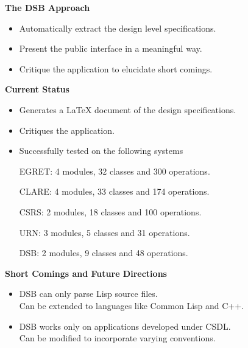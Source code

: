 \begin{slide} \Huge 
  {\bf The DSB Approach}
  \horizontalline

  \begin{itemize}    
  \item Automatically extract the design level specifications.

   \item Present the public interface in a meaningful way.
    
  \item Critique the application to elucidate short comings.

  \end{itemize}
\end{slide} \Huge 


\begin{slide} \Huge 
  {\bf Current Status}
  \horizontalline

  \begin{itemize}    
  \item Generates a LaTeX document of the design specifications.

  \item Critiques the application.
  \item Successfully tested on the following systems

    EGRET: 4 modules, 32 classes and 300 operations.

    CLARE: 4 modules, 33 classes and 174 operations.
    
    CSRS: 2 modules, 18 classes and 100 operations.
    
    URN: 3 modules, 5 classes and 31 operations. 
    
    DSB: 2 modules, 9 classes and 48 operations.


  \end{itemize}
\end{slide} \Huge 


\begin{slide} \Huge 
  {\bf Short Comings and Future Directions}
  \horizontalline
  
  \begin{itemize}
  \item DSB can only parse Lisp source files.\\
    Can be extended to languages like Common Lisp and C++.
    
  \item DSB works only on applications developed under CSDL. \\
    Can be modified to incorporate varying conventions.
    
  \end{itemize}
\end{slide} \Huge 












